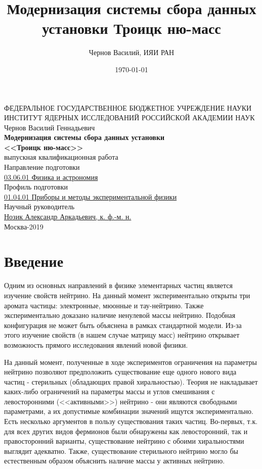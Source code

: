 \documentclass[a4paper,14pt]{extreport}
\title{Модернизация системы сбора данных установки Троицк ню-масс}
\author{Чернов Василий, ИЯИ РАН}
\date{\today}
\begin{document}
\thispagestyle{empty}
\begin{center}
\hfill \break
\normalsize{ФЕДЕРАЛЬНОЕ  ГОСУДАРСТВЕННОЕ БЮДЖЕТНОЕ УЧРЕЖДЕНИЕ НАУКИ}\\
\normalsize{ИНСТИТУТ ЯДЕРНЫХ ИССЛЕДОВАНИЙ РОССИЙСКОЙ АКАДЕМИИ НАУК} \\
\hfill \break
\hfill \break
\hfill \break
\normalsize{Чернов Василий Геннадьевич}\\
\hfill \break
\hfill \break
\normalsize{\textbf{Модернизация системы сбора данных установки \\ <<Троицк ню-масс>>}} \\
\hfill \break
\hfill \break
\normalsize{выпускная квалификационная работа} \\
\hfill \break
\hfill \break
Направление подготовки \\
\underline{03.06.01 Физика и астрономия} \\
\hfill \break
\hfill \break
Профиль подготовки \\
\underline{01.04.01 Приборы и методы экспериментальной физики} \\
\hfill \break
\hfill \break
Научный руководитель\\
\underline{Нозик Александр Аркадьевич, к. ф.-м. н.} \\
\hfill \break
\hfill \break
\hfill \break
\hfill \break
\hfill \break
\normalsize{ Москва-2019 }\\
\end{center}
\newpage

\setcounter{tocdepth}{3}
\tableofcontents

\chapter*{Введение}

Одним из основных направлений в физике элементарных частиц является изучение свойств нейтрино. На данный момент экспериментально открыты три аромата частицы: электронные, мюонные и тау-нейтрино. Также экспериментально доказано наличие ненулевой массы нейтрино. Подобная конфигурация не может быть объяснена в рамках стандартной модели. Из-за этого изучение свойств (в нашем случае матрицу масс) нейтрино открывает возможность прямого исследования явлений новой физики.

На данный момент, полученные в ходе экспериментов ограничения на параметры нейтрино позволяют предположить существование еще одного нового вида частиц - стерильных (обладающих правой хиральностью). Теория не накладывает каких-либо ограничений на параметры массы и углов смешивания с левосторонними (<<активными>>) нейтрино - они являются свободными параметрами, а их допустимые комбинации значений ищутся экспериментально. Есть несколько аргументов в пользу существования таких частиц. Во-первых, т.к. для всех других видов фермионов были обнаружены как левосторонний, так и правосторонний варианты, существование нейтрино с обоими хиральностями выглядит адекватно. Также, существование стерильного нейтрино могло бы естественным образом объяснить наличие массы у активных нейтрино.
\end{document}
